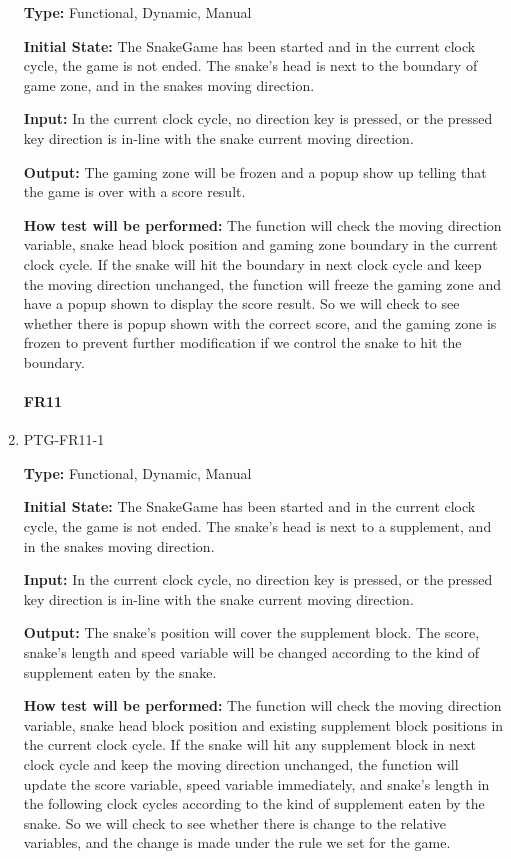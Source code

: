 \documentclass[12pt, titlepage]{article}
\begin{document}
\begin{enumerate}
\textbf{Type:} Functional, Dynamic, Manual

\textbf{Initial State:} The SnakeGame has been started and in the current clock cycle, the game is not ended. The snake's head is next to the boundary of game zone, and in the snakes moving direction.

\textbf{Input:} In the current clock cycle, no direction key is pressed, or the pressed key direction is in-line with the snake current moving direction.
 
\textbf{Output:} The gaming zone will be frozen and a popup show up telling that the game is over with a score result. 

\textbf{How test will be performed:} The function will check the moving direction variable, snake head block position and gaming zone boundary in the current clock cycle. If the snake will hit the boundary in next clock cycle and keep the moving  direction unchanged, the function will freeze the gaming zone and have a popup shown to display the score result. So we will check to see whether there is popup shown with the correct score, and the gaming zone is frozen to prevent further modification if we control the snake to hit the boundary.
\paragraph{FR11}
\item{PTG-FR11-1\\}

\textbf{Type:} Functional, Dynamic, Manual

\textbf{Initial State:} The SnakeGame has been started and in the current clock cycle, the game is not ended. The snake's head is next to a supplement, and in the snakes moving direction.

\textbf{Input:} In the current clock cycle, no direction key is pressed, or the pressed key direction is in-line with the snake current moving direction.
 
\textbf{Output:} The snake's position will cover the supplement block. The score, snake's length and speed variable will be changed according to the kind of supplement eaten by the snake.

\textbf{How test will be performed:} The function will check the moving direction variable, snake head block position and existing supplement block positions in the current clock cycle. If the snake will hit any supplement block in next clock cycle and keep the moving direction unchanged, the function will update the score variable, speed variable immediately, and snake's length in the following clock cycles according to the kind of supplement eaten by the snake. So we will check to see whether there is change to the relative variables, and the change is made under the rule we set for the game.



\end{enumerate}
\end{document}
